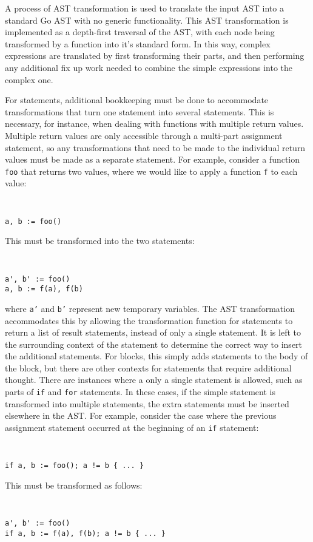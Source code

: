 \documentclass[letterpaper,twocolumn,11pt]{article}
\begin{document}
A process of AST transformation is used to translate the input AST into a standard Go AST with no generic functionality. This AST transformation is implemented as a depth-first traversal of the AST, with each node being transformed by a function into it's standard form. In this way, complex expressions are translated by first transforming their parts, and then performing any additional fix up work needed to combine the simple expressions into the complex one.

For statements, additional bookkeeping must be done to accommodate transformations that turn one statement into several statements. This is necessary, for instance, when dealing with functions with multiple return values. Multiple return values are only accessible through a multi-part assignment statement, so any transformations that need to be made to the individual return values must be made as a separate statement. For example, consider a function \texttt{foo} that returns two values, where we would like to apply a function \texttt{f} to each value:
{ \tt \small
\begin{verbatim}
a, b := foo()
\end{verbatim}
}
This must be transformed into the two statements:
{ \tt \small
\begin{verbatim}
a', b' := foo()
a, b := f(a), f(b)
\end{verbatim}
}
where \texttt{a'} and \texttt{b'} represent new temporary variables. The AST transformation accommodates this by allowing the transformation function for statements to return a list of result statements, instead of only a single statement. It is left to the surrounding context of the statement to determine the correct way to insert the additional statements. For blocks, this simply adds statements to the body of the block, but there are other contexts for statements that require additional thought. There are instances where a only a single statement is allowed, such as parts of \texttt{if} and \texttt{for} statements. In these cases, if the simple statement is transformed into multiple statements, the extra statements must be inserted elsewhere in the AST. For example, consider the case where the previous assignment statement occurred at the beginning of an \texttt{if} statement:
{ \tt \small
\begin{verbatim}
if a, b := foo(); a != b { ... }
\end{verbatim} 
}

This must be transformed as follows:
{ \tt \small
\begin{verbatim}
a', b' := foo()
if a, b := f(a), f(b); a != b { ... }
\end{verbatim}
}
\end{document}
